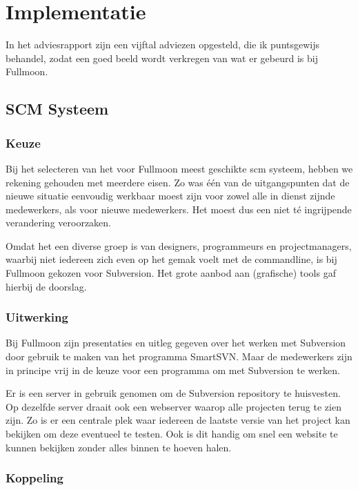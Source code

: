 \chapter{Implementatie}

In het adviesrapport zijn een vijftal adviezen opgesteld, die ik puntsgewijs behandel, zodat een goed beeld wordt verkregen van wat er gebeurd is bij Fullmoon.

\section{SCM Systeem}

\subsection{Keuze}

Bij het selecteren van het voor Fullmoon meest geschikte {\sc scm} systeem, hebben we rekening gehouden met meerdere eisen. Zo was één van de uitgangspunten dat de nieuwe situatie eenvoudig werkbaar moest zijn voor zowel alle in dienst zijnde medewerkers, als voor nieuwe medewerkers. Het moest dus een niet té ingrijpende verandering veroorzaken.

Omdat het een diverse groep is van designers, programmeurs en projectmanagers, waarbij niet iedereen zich even op het gemak voelt met de commandline, is bij Fullmoon gekozen voor Subversion. Het grote aanbod aan (grafische) tools gaf hierbij de doorslag.

\subsection{Uitwerking}

Bij Fullmoon zijn presentaties en uitleg gegeven over het werken met Subversion door gebruik te maken van het programma SmartSVN. Maar de medewerkers zijn in principe vrij in de keuze voor een programma om met Subversion te werken.

Er is een server in gebruik genomen om de Subversion repository te huisvesten. Op dezelfde server draait ook een webserver waarop alle projecten terug te zien zijn. Zo is er een centrale plek waar iedereen de laatste versie van het project kan bekijken om deze eventueel te testen. Ook is dit handig om snel een website te kunnen bekijken zonder alles binnen te hoeven halen.

\subsection{Koppeling}

